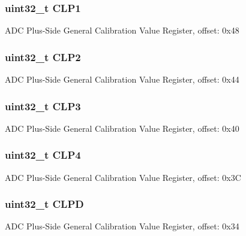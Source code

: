 \subsubsection[{C\+L\+P1}]{\setlength{\rightskip}{0pt plus 5cm}uint32\+\_\+t C\+L\+P1}\label{struct_a_d_c___mem_map_a64450733d1755c38f9466f948ed168c5}
A\+D\+C Plus-\/\+Side General Calibration Value Register, offset\+: 0x48 \hypertarget{struct_a_d_c___mem_map_a225ce534c9832c8555edd6473b59a41d}{}
\subsubsection[{C\+L\+P2}]{\setlength{\rightskip}{0pt plus 5cm}uint32\+\_\+t C\+L\+P2}\label{struct_a_d_c___mem_map_a225ce534c9832c8555edd6473b59a41d}
A\+D\+C Plus-\/\+Side General Calibration Value Register, offset\+: 0x44 \hypertarget{struct_a_d_c___mem_map_a3f5dd3a4999f81c45c41be08a3849b98}{}
\subsubsection[{C\+L\+P3}]{\setlength{\rightskip}{0pt plus 5cm}uint32\+\_\+t C\+L\+P3}\label{struct_a_d_c___mem_map_a3f5dd3a4999f81c45c41be08a3849b98}
A\+D\+C Plus-\/\+Side General Calibration Value Register, offset\+: 0x40 \hypertarget{struct_a_d_c___mem_map_aa37bf517bbdb99a00864e6ecb1122a6c}{}
\subsubsection[{C\+L\+P4}]{\setlength{\rightskip}{0pt plus 5cm}uint32\+\_\+t C\+L\+P4}\label{struct_a_d_c___mem_map_aa37bf517bbdb99a00864e6ecb1122a6c}
A\+D\+C Plus-\/\+Side General Calibration Value Register, offset\+: 0x3\+C \hypertarget{struct_a_d_c___mem_map_acac4a93dc04aede7fd824d16b6810a45}{}
\subsubsection[{C\+L\+P\+D}]{\setlength{\rightskip}{0pt plus 5cm}uint32\+\_\+t C\+L\+P\+D}\label{struct_a_d_c___mem_map_acac4a93dc04aede7fd824d16b6810a45}
A\+D\+C Plus-\/\+Side General Calibration Value Register, offset\+: 0x34 \hypertarget{struct_a_d_c___mem_map_ab05c59171a0798d67bac0442294ace5c}{}
